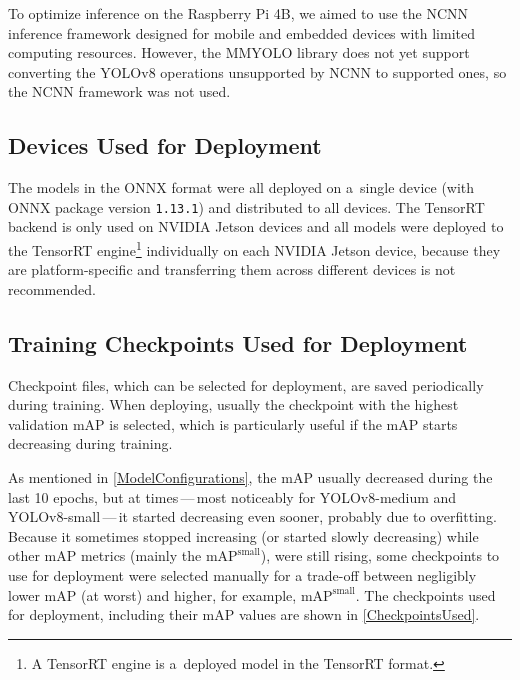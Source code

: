 To optimize inference on the Raspberry Pi 4B, we aimed to use the NCNN inference
framework designed for mobile and embedded devices with limited computing
resources. However, the MMYOLO library does not yet support converting the
YOLOv8 operations unsupported by NCNN to supported ones, so the NCNN framework
was not used.


\subsection*{Devices Used for Deployment}

The models in the ONNX format were all deployed on a~single device (with ONNX
package version \texttt{1.13.1}) and distributed to all devices. The TensorRT
backend is only used on NVIDIA Jetson devices and all models were deployed to
the TensorRT engine\footnote{A TensorRT engine is a~deployed model in the
TensorRT format.} individually on each NVIDIA Jetson device, because they are
platform-specific and transferring them across different devices is not
recommended.



\subsection*{Training Checkpoints Used for Deployment}

Checkpoint files, which can be selected for deployment, are saved periodically
during training. When deploying, usually the checkpoint with the highest
validation mAP is selected, which is particularly useful if the mAP starts
decreasing during training.

As mentioned in \autoref{ModelConfigurations}, the mAP usually decreased during
the last 10 epochs, but at times\,---\,most noticeably for YOLOv8-medium and
YOLOv8-small\,---\,it started decreasing even sooner, probably due to
overfitting. Because it sometimes stopped increasing (or started slowly
decreasing) while other mAP metrics (mainly the $\text{mAP}^{\text{small}}$),
were still rising, some checkpoints to use for deployment were selected manually
for a trade-off between negligibly lower mAP (at worst) and higher, for example,
$\text{mAP}^{\text{small}}$. The checkpoints used for deployment, including
their mAP values are shown in \autoref{CheckpointsUsed}.

